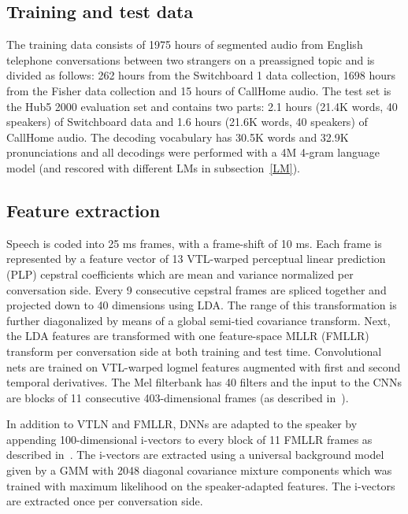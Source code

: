 \documentclass[a4paper]{article}
\begin{document}
\subsection{Training and test data}

The training data consists of 1975 hours of segmented audio from English telephone
conversations between two strangers on a preassigned topic and is
divided as follows: 262 hours from the Switchboard
1 data collection, 1698 hours from the Fisher data
collection and 15 hours of CallHome audio. The test set is
the Hub5 2000 evaluation set and contains two parts: 2.1 hours (21.4K
words, 40 speakers) of Switchboard data and 1.6 hours (21.6K words, 40
speakers) of CallHome audio. The decoding vocabulary has 30.5K words
and 32.9K pronunciations and all decodings were performed with a 4M
4-gram language model (and rescored with different LMs in
subsection~\ref{LM}).

\subsection{Feature extraction}

Speech is coded into 25 ms frames, with a frame-shift of 10 ms. Each
frame is represented by a feature vector of 13 VTL-warped perceptual
linear prediction (PLP) cepstral coefficients which are mean and
variance normalized per conversation side. Every 9 consecutive
cepstral frames are spliced together and projected down to 40
dimensions using LDA. The range of this transformation is further
diagonalized by means of a global semi-tied covariance
transform. Next, the LDA features are transformed with one
feature-space MLLR (FMLLR) transform per conversation side at both
training and test time. Convolutional nets are trained on VTL-warped
logmel features augmented with first and second temporal
derivatives. The Mel filterbank has 40 filters and the input to the
CNNs are blocks of 11 consecutive 403-dimensional frames (as
described in~\cite{soltau14}).

In addition to VTLN and FMLLR, DNNs are adapted to the speaker by
appending 100-dimensional i-vectors to every block of 11 FMLLR frames
as described in~\cite{saon13}. The i-vectors are extracted using a
universal background model given by a GMM with 2048 diagonal
covariance mixture components which was trained with maximum
likelihood on the speaker-adapted features. The i-vectors are
extracted once per conversation side.
\end{document}
